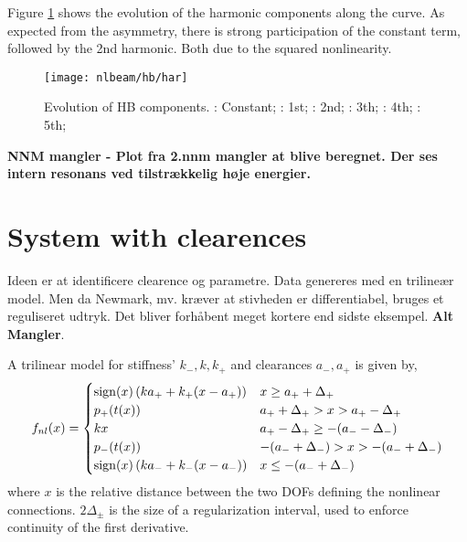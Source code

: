 Figure \ref{fig:nlbeam_hb_components} shows the evolution of the harmonic
components along the curve. As expected from the asymmetry, there is strong
participation of the constant term, followed by the 2nd harmonic. Both due to
the squared nonlinearity.

\begin{figure}[!ht]
  \centering
  \texttt{[image: nlbeam/hb/har]}
  \caption{Evolution of HB components.
    \textcolor{blue}{\sampleline{}}: Constant;
    \sampleline{}: 1st;
    \textcolor{orange}{}: 2nd;
    \textcolor{green}{}: 3th;
    \textcolor{red}{\sampleline{}}: 4th;
    \textcolor{purple}{}: 5th;
  }
  \label{fig:nlbeam_hb_components}
\end{figure}

\textbf{NNM mangler - Plot fra 2.nnm mangler at blive beregnet. Der ses intern
  resonans ved tilstrækkelig høje energier.}

\FloatBarrier
\section{System with clearences}
\label{sec:syst-with-clear}

Ideen er at identificere clearence og parametre. Data genereres med en trilineær
model. Men da Newmark, mv. kræver at stivheden er differentiabel, bruges et
reguliseret udtryk. Det bliver forhåbent meget kortere end sidste eksempel. \textbf{Alt Mangler}.

A trilinear model for stiffness' $k_-, k, k_+$ and clearances $a_-, a_+$ is
given by, %
\begin{equation}
  \label{eq:fnl_piecewise}
  f_{nl}(x) =
  \begin{cases}
    \operatorname{sign}(x) \left( ka_+ + k_+(x-a_+) \right) & x \geq a_+ + \Delta_+ \\
    p_+(t(x)) & a_+ + \Delta_+ > x > a_+ - \Delta_+ \\
    kx & a_+ - \Delta_+ \geq -(a_- - \Delta_-) \\
    p_-(t(x)) & -(a_- + \Delta_-) > x > -(a_- + \Delta_-) \\
    \operatorname{sign}(x) \left( ka_- + k_-(x-a_-) \right) & x \leq -(a_- + \Delta_-) \\
  \end{cases}
\end{equation}
where $x$ is the relative distance between the two DOFs defining the nonlinear
connections. $2\Delta_\pm$ is the size of a regularization interval, used to
enforce continuity of the first derivative.

